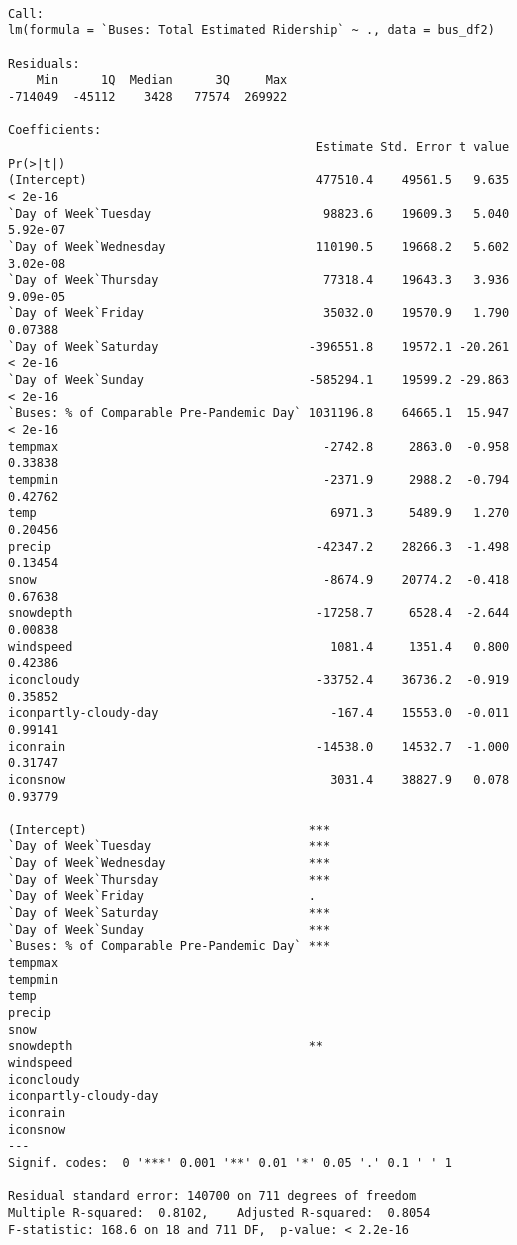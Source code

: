\documentclass[
  letterpaper,
  DIV=11,
  numbers=noendperiod]{scrartcl}
\begin{document}
\begin{verbatim}

Call:
lm(formula = `Buses: Total Estimated Ridership` ~ ., data = bus_df2)

Residuals:
    Min      1Q  Median      3Q     Max 
-714049  -45112    3428   77574  269922 

Coefficients:
                                           Estimate Std. Error t value Pr(>|t|)
(Intercept)                                477510.4    49561.5   9.635  < 2e-16
`Day of Week`Tuesday                        98823.6    19609.3   5.040 5.92e-07
`Day of Week`Wednesday                     110190.5    19668.2   5.602 3.02e-08
`Day of Week`Thursday                       77318.4    19643.3   3.936 9.09e-05
`Day of Week`Friday                         35032.0    19570.9   1.790  0.07388
`Day of Week`Saturday                     -396551.8    19572.1 -20.261  < 2e-16
`Day of Week`Sunday                       -585294.1    19599.2 -29.863  < 2e-16
`Buses: % of Comparable Pre-Pandemic Day` 1031196.8    64665.1  15.947  < 2e-16
tempmax                                     -2742.8     2863.0  -0.958  0.33838
tempmin                                     -2371.9     2988.2  -0.794  0.42762
temp                                         6971.3     5489.9   1.270  0.20456
precip                                     -42347.2    28266.3  -1.498  0.13454
snow                                        -8674.9    20774.2  -0.418  0.67638
snowdepth                                  -17258.7     6528.4  -2.644  0.00838
windspeed                                    1081.4     1351.4   0.800  0.42386
iconcloudy                                 -33752.4    36736.2  -0.919  0.35852
iconpartly-cloudy-day                        -167.4    15553.0  -0.011  0.99141
iconrain                                   -14538.0    14532.7  -1.000  0.31747
iconsnow                                     3031.4    38827.9   0.078  0.93779
                                             
(Intercept)                               ***
`Day of Week`Tuesday                      ***
`Day of Week`Wednesday                    ***
`Day of Week`Thursday                     ***
`Day of Week`Friday                       .  
`Day of Week`Saturday                     ***
`Day of Week`Sunday                       ***
`Buses: % of Comparable Pre-Pandemic Day` ***
tempmax                                      
tempmin                                      
temp                                         
precip                                       
snow                                         
snowdepth                                 ** 
windspeed                                    
iconcloudy                                   
iconpartly-cloudy-day                        
iconrain                                     
iconsnow                                     
---
Signif. codes:  0 '***' 0.001 '**' 0.01 '*' 0.05 '.' 0.1 ' ' 1

Residual standard error: 140700 on 711 degrees of freedom
Multiple R-squared:  0.8102,    Adjusted R-squared:  0.8054 
F-statistic: 168.6 on 18 and 711 DF,  p-value: < 2.2e-16
\end{verbatim}
\end{document}
